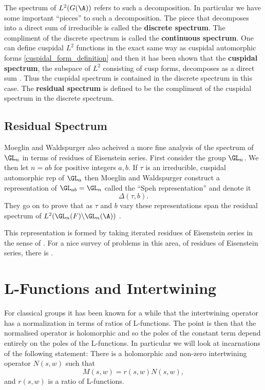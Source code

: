 The spectrum of \(L^2(G(\A))\) refers to such a decomposition. In particular we have some important ``pieces'' to such a decomposition. The piece that decomposes into a direct sum of irreducible is called the \textbf{discrete spectrum}. The compliment of the discrete spectrum is called the \textbf{continuous spectrum}. One can define cuspidal \(L^2\) functions in the exact same way as cuspidal automorphic forms \ref{cuspidal_form_definition} and then it has been shown that the \textbf{cuspidal spectrum}, the subspace of \(L^2\) consisting of cusp forms, decomposes as a direct sum \cite[9]{getzIntroductionAutomorphicRepresentations2024}. Thus the cuspidal spectrum is contained in the discrete spectrum in this case. The \textbf{residual spectrum} is defined to be the compliment of the cuspidal spectrum in the discrete spectrum.

\subsection{Residual Spectrum}\label{residual_spec}
Moeglin and Waldspurger also acheived a more fine analysis of the spectrum of \(\GL_n\) in terms of residues of Eisenstein series. 
First consider the group \(\GL_n\). We then let \(n = ab\) for positive integers \(a,b\). If \(\tau\) is an irreducible, cuspidal automorphic rep of \(\GL_a\) then Moeglin and Waldspurger construct a representation of \(\GL_{ab} = \GL_n\) called the ``Speh representation'' and denote it 
\[\Delta(\tau, b).\]
They go on to prove that as \(\tau\) and \(b\) vary these representations span the residual spectrum of \(L^2(\GL_n(F) \backslash \GL_n(\A))\) \cite[Thm. 1.1]{jiangPolesCertainResidual2013}.

This representation is formed by taking iterated residues of Eisenstein series in the sense of \cite[V]{moeglinSpectralDecompositionEisenstein1995}. For a nice survey of problems in this area, of residues of Eisenstein series, there is \cite{jiangResiduesEisensteinSeries2008a}.


\section{L-Functions and Intertwining}\label{L_inter}
For classical groups it has been known for a while that the intertwining operator has a normalization in terms of ratios of L-functions. The point is then that the normalised operator is holomorphic and so the poles of the constant term depend entirely on the poles of the L-functions. In particular we will look at incarnations of the following statement: There is a holomorphic and non-zero intertwining operator \(N(s, w)\) such that 
    \[M(s, w) = r(s, w)N(s,w),\]
    and \(r(s, w)\) is a ratio of L-functions.


